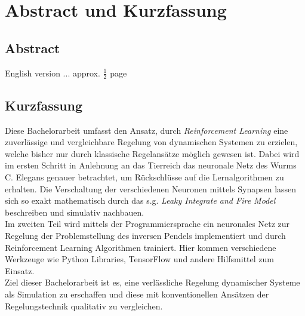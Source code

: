 %
\chapter*{Abstract und Kurzfassung}
%

%
\section*{Abstract}
%

English version ... approx. $\frac{1}{2}$ page

%
\section*{Kurzfassung}
%

Diese Bachelorarbeit umfasst den Ansatz, durch \textit{Reinforcement Learning} eine zuverlässige und vergleichbare Regelung von dynamischen Systemen zu erzielen, welche bisher nur durch klassische Regelansätze möglich gewesen ist. Dabei wird im ersten Schritt in Anlehnung an das Tierreich das neuronale Netz des Wurms C. Elegans \cite{WormLevelRL} genauer betrachtet, um Rückschlüsse auf die Lernalgorithmen zu erhalten. Die Verschaltung der verschiedenen Neuronen mittels Synapsen lassen sich so exakt mathematisch durch das s.g. \textit{Leaky Integrate and Fire Model} beschreiben und simulativ nachbauen.\\
Im zweiten Teil wird mittels der Programmiersprache  ein neuronales Netz zur Regelung der Problemstellung des inversen Pendels implementiert und durch Reinforcement Learning Algorithmen trainiert. Hier kommen verschiedene Werkzeuge wie Python Libraries, TensorFlow und andere Hilfsmittel zum Einsatz.\\
Ziel dieser Bachelorarbeit ist es, eine verlässliche Regelung dynamischer Systeme als Simulation zu erschaffen und diese mit konventionellen Ansätzen der Regelungstechnik qualitativ zu vergleichen.









